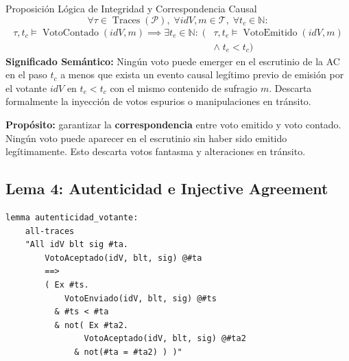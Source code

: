 \documentclass[12pt, a4paper, twoside, openright]{book}
\begin{document}
\begin{cajaLogica}{Proposici\'on L\'ogica de Integridad y Correspondencia Causal}
  \[
    \forall \tau \in \operatorname{Traces}(\mathcal{P}),\; \forall \mathit{idV}, m \in \mathcal{T},\; \forall t_c \in \mathbb{N}:
  \]
  \[
    \begin{aligned}
      \tau, t_c \models \operatorname{VotoContado}(\mathit{idV}, m) \implies
      \exists t_e \in \mathbb{N}:\; \Big( &\tau, t_e \models \operatorname{VotoEmitido}(\mathit{idV}, m) \\
      &\land\; t_e < t_c \Big)
    \end{aligned}
  \]
  \textbf{Significado Sem\'antico:} Ning\'un voto puede emerger en el escrutinio de la AC en el paso $t_c$ a menos que exista un evento causal leg\'itimo previo de emisi\'on por el votante $\mathit{idV}$ en $t_e < t_c$ con el mismo contenido de sufragio $m$. Descarta formalmente la inyecci\'on de votos espurios o manipulaciones en tr\'ansito.
\end{cajaLogica}

\textbf{Prop\'osito:} garantizar la \textbf{correspondencia} entre
voto emitido y voto contado. Ning\'un voto puede aparecer en el
escrutinio sin haber sido emitido leg\'itimamente. Esto descarta votos
fantasma y alteraciones en tr\'ansito.

\subsection{Lema 4: Autenticidad e Injective Agreement}

\begin{lstlisting}[caption={Autenticidad: injective agreement entre env\'io y aceptaci\'on.}]
lemma autenticidad_votante:
    all-traces
    "All idV blt sig #ta.
        VotoAceptado(idV, blt, sig) @#ta
        ==>
        ( Ex #ts.
            VotoEnviado(idV, blt, sig) @#ts
          & #ts < #ta
          & not( Ex #ta2.
                VotoAceptado(idV, blt, sig) @#ta2
              & not(#ta = #ta2) ) )"
\end{lstlisting}
\end{document}
